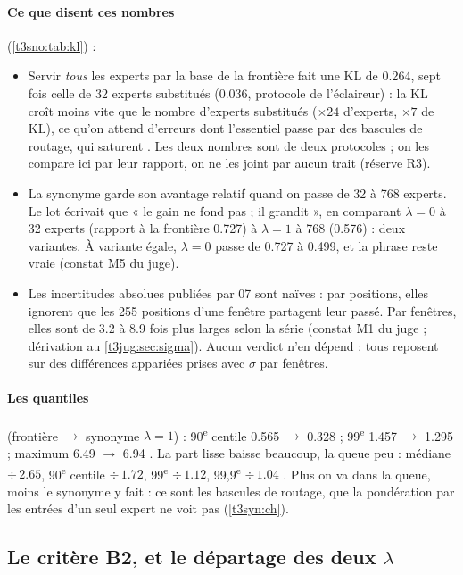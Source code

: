 \paragraph{Ce que disent ces nombres} (\cref{t3sno:tab:kl}) :
\begin{itemize}
\item Servir \emph{tous} les experts par la base de la frontière fait une KL de \num{0.264}, sept fois celle de 32 experts substitués (\num{0.036}, protocole de l'éclaireur) : la KL croît moins vite que le nombre d'experts substitués ($\times 24$ d'experts, $\times 7$ de KL), ce qu'on attend d'erreurs dont l'essentiel passe par des bascules de routage, qui saturent \calc. Les deux nombres sont de deux protocoles ; on les compare ici par leur rapport, on ne les joint par aucun trait (réserve R3).
\item La synonyme garde son avantage relatif quand on passe de 32 à 768 experts. Le lot écrivait que « le gain ne fond pas ; il grandit », en comparant $\lambda = 0$ à 32 experts (rapport à la frontière \num{0.727}) à $\lambda = 1$ à 768 (\num{0.576}) : deux variantes. À variante égale, $\lambda = 0$ passe de \num{0.727} à \num{0.499}, et la phrase reste vraie (constat M5 du juge).
\item Les incertitudes absolues publiées par 07 sont naïves : par positions, elles ignorent que les \num{255} positions d'une fenêtre partagent leur passé. Par fenêtres, elles sont de \num{3.2} à \num{8.9} fois plus larges selon la série (constat M1 du juge ; dérivation au \cref{t3jug:sec:sigma}). Aucun verdict n'en dépend : tous reposent sur des différences appariées prises avec $\sigma$ par fenêtres.
\end{itemize}

\paragraph{Les quantiles} (frontière $\to$ synonyme $\lambda = 1$) : 90\textsuperscript{e} centile \num{0.565} $\to$ \num{0.328} ; 99\textsuperscript{e} \num{1.457} $\to$ \num{1.295} ; maximum \num{6.49} $\to$ \num{6.94} \mes. La part lisse baisse beaucoup, la queue peu : médiane $\div\,\num{2.65}$, 90\textsuperscript{e} centile $\div\,\num{1.72}$, 99\textsuperscript{e} $\div\,\num{1.12}$, 99,9\textsuperscript{e} $\div\,\num{1.04}$ \calc. Plus on va dans la queue, moins le synonyme y fait : ce sont les bascules de routage, que la pondération par les entrées d'un seul expert ne voit pas (\cref{t3syn:ch}).

\subsection{Le critère B2, et le départage des deux \texorpdfstring{$\lambda$}{lambda}}\label{t3sno:sec:b2}

